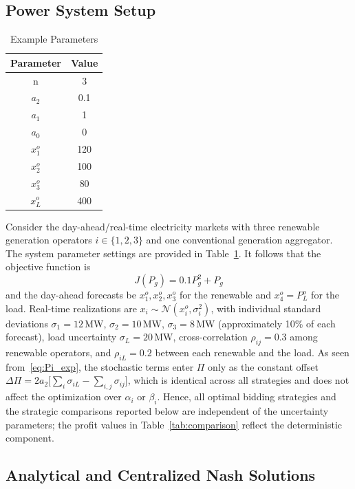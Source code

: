 \documentclass[conference]{IEEEtran}
\begin{document}
\subsection{Power System Setup}

\begin{table}[hbt!]
\centering
\caption{Example Parameters}
\label{tab:example_params}
\begin{tabular}{|c c|}
\hline
\textbf{Parameter} & \textbf{Value} \\
\hline
n & $3$ \\
$a_2$ & 0.1 \\
$a_1$ & 1 \\
$a_0$ & 0 \\
$x_1^o$ & 120 \\
$x_2^o$ & 100 \\
$x_3^o$ & 80 \\
$x_L^o$ & 400 \\
\hline
\end{tabular}
\end{table}

Consider the day-ahead/real-time electricity markets with three renewable generation operators $i \in \{1,2,3\}$ and one conventional generation aggregator. The system parameter settings are provided in Table~\ref{tab:example_params}. It follows that the objective function is 
\[
J(P_g) = 0.1P_g^2 + P_g
\]
and the day-ahead forecasts be $x_1^o, x_2^o, x_3^o$ for the renewable and $x_4^o = P_L^o$ for the load. Real-time realizations are $x_i \sim \mathcal{N}(x_i^o,\sigma_i^2)$, with individual standard deviations $\sigma_1 = 12$\,MW, $\sigma_2 = 10$\,MW, $\sigma_3 = 8$\,MW (approximately 10\% of each forecast), load uncertainty $\sigma_L = 20$\,MW, cross-correlation $\rho_{ij}=0.3$ among renewable operators, and $\rho_{iL}=0.2$ between each renewable and the load. As seen from~\eqref{eq:Pi_exp}, the stochastic terms enter $\Pi$ only as the constant offset $\Delta\Pi = 2a_2\bigl[\sum_i\sigma_{iL} - \sum_{i,j}\sigma_{ij}\bigr]$, which is identical across all strategies and does not affect the optimization over $\alpha_i$ or $\beta_i$. Hence, all optimal bidding strategies and the strategic comparisons reported below are independent of the uncertainty parameters; the profit values in Table~\ref{tab:comparison} reflect the deterministic component.

\subsection{Analytical and Centralized Nash Solutions}
\end{document}
